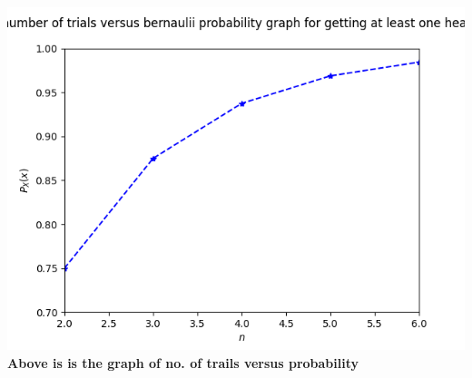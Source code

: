 \documentclass[journel,12pt,twocoloums]{IEEEtran}
\begin{document}
\includegraphics[width=\coloumnwidth]{Figure_1.png}
\textbf{Above is is the graph of no. of trails versus probability }
            
\end{document}
